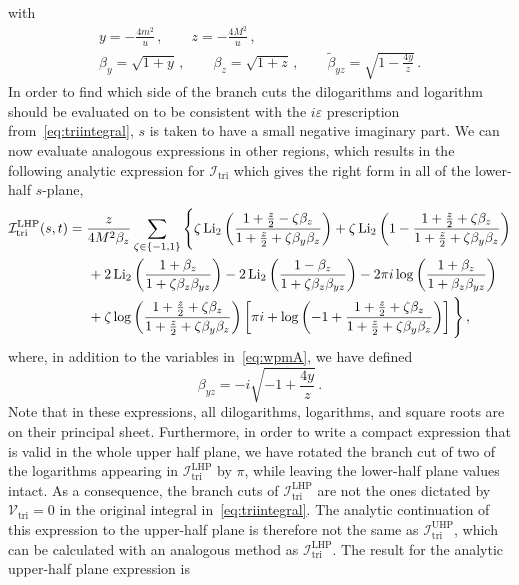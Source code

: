 \documentclass[12pt]{article}
\numberwithin{figure}{section}
\def \be {\begin{equation}}
\def \ee {\end{equation}}
\def \eps {\varepsilon}
\def \V {\mathcal{V}}
\def \I {\mathcal{I}}
\def \triangle {\mathrm{tri}}
\def \Li {\mathrm{Li}}
\def \UHP {\mathrm{UHP}}
\def \LHP {\mathrm{LHP}}
\begin{document}
    with
    \begin{gather}
        y  = - \frac{4 m^2}{u} \,, \qquad z = - \frac{4 M^2}{u} \,, \\
        \beta_y  = \sqrt{1+y}\,, \qquad \beta_z = \sqrt{1+z}\,, \qquad \tilde \beta_{yz}  = \sqrt{1-\frac{4y}{z}} \,.
        \label{eq:wpmA}
    \end{gather}
    In order to find which side of the branch cuts the dilogarithms and logarithm should be evaluated on to be consistent with the $i \eps$ prescription from~\eqref{eq:triintegral}, $s$ is taken to have a small negative imaginary part.
    We can now evaluate analogous expressions in other regions, which results in the following analytic expression for $\mathcal{I}_\triangle$ which gives the right form in all of the lower-half $s$-plane,
	\be
    \begin{aligned}
    \mathcal{I}_\triangle^{\LHP} (s,t) & = \frac{z}{4 M^2 \beta_z} 
        \sum_{\zeta \in \{-1,1\}} \Bigg\{
        \zeta \, \Li_2 \left( \frac{1+\frac{z}{2} - \zeta \beta_z}{1+ \frac{z}{2} + \zeta \beta_y \beta_z } \right)
        +
        \zeta \,
        \Li_2 \left(1- \frac{1+\frac{z}{2} + \zeta \beta_z}{1+ \frac{z}{2} + \zeta \beta_y \beta_z } \right) 
        \\ 
        & \hspace{0.5cm}
        +2 \, \Li_2 \left( \frac{1 + \beta_z}{1 + \zeta \beta_z \beta_{yz}} \right)  - 2 \, \Li_2 \left( \frac{1-\beta_z}{1 + \zeta \beta_z \beta_{yz}} \right) 
        -
        2 \pi i \log \left( \frac{1+\beta_z}{1+\beta_z \beta_{yz}} \right)
        \\ 
        & \hspace{0.5cm}
        + \zeta
        \log \left( \frac{1+\frac{z}{2}+\zeta \beta_z}{1+\frac{z}{2}+\zeta \beta_y \beta_z} \right) \left[\pi i + \log \left( -1 + \frac{1+ \frac{z}{2}+ \zeta \beta_z}{1+\frac{z}{2}+ \zeta \beta_y \beta_z} \right) \right]
        \Bigg\} \,,
    \label{eq:triLHP}
    \end{aligned}
    \ee
    where, in addition to the variables in~\eqref{eq:wpmA}, we have defined
    \begin{equation}
        \beta_{yz}  = - i \sqrt{-1+\frac{4y}{z}} \,.
        \label{eq:wpm}
    \end{equation}
    Note that in these expressions, all dilogarithms, logarithms, and square roots are on their principal sheet. Furthermore, in order to write a compact expression that is valid in the whole upper half plane, we have rotated the branch cut of two of the logarithms appearing in $\mathcal{I}_\triangle^{\LHP}$ by $\pi$, while leaving the lower-half plane values intact. As a consequence, the branch cuts of $\mathcal{I}_\triangle^{\LHP}$ are not the ones dictated by $\V_\triangle=0$ in the original integral in~\eqref{eq:triintegral}. The analytic continuation of this expression to the upper-half plane is therefore not the same as $\I_{\triangle}^{\UHP}$, which can be calculated with an analogous method as $\I_{\triangle}^{\LHP}$. The result for the analytic upper-half plane expression is
\end{document}
